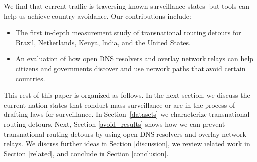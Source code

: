 We find that current traffic is traversing known surveillance states, but tools can help us achieve country avoidance. Our contributions 
include: 

\begin{itemize}
\item The first in-depth measurement study of
  transnational routing detours for Brazil, Netherlands, Kenya, India, and the
  United States. 
\item An evaluation of how open DNS resolvers and overlay
  network relays can help citizens and governments discover and use
  network paths that avoid certain countries.
\end{itemize}
\noindent

This rest of this paper is organized as follows.  In the next section, we discuss
the current nation-states that conduct mass surveillance or are in the 
process of drafting laws for surveillance.  In
Section~\ref{datasets} we characterize transnational routing detours. Next, Section
\ref{avoid_results} shows how we can prevent transnational routing detours by using open DNS resolvers
and overlay network relays.  We discuss further ideas in Section
\ref{discussion}, we review related work in Section \ref{related}, and
conclude in Section \ref{conclusion}. 
